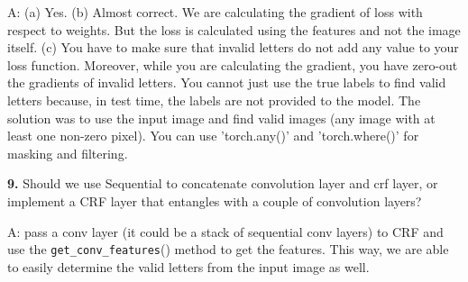 \documentclass[11pt]{report}
\begin{document}
A: (a) Yes.
(b) Almost correct. We are calculating the gradient of loss with respect to weights.  But the loss is calculated using the features and not the image itself.
(c) You have to make sure that invalid letters do not add any value to your loss function. Moreover, while you are calculating the gradient, you have zero-out the gradients of invalid letters. You cannot just use the true labels to find valid letters because, in test time, the labels are not provided to the model. The solution was to use the input image and find valid images (any image with at least one non-zero pixel). You can use 'torch.any()' and 'torch.where()' for masking and filtering. 


\textbf{9.} 
Should we use Sequential to concatenate convolution layer and crf layer, or implement a CRF layer that entangles with a couple of convolution layers?

A: pass a conv layer (it could be a stack of sequential conv layers) to CRF and use the \verb#get_conv_features#() method to get the features. This way, we are able to easily determine the valid letters from the input image as well. 



 
\label{sec:appdxconvfilters}
\end{document}
